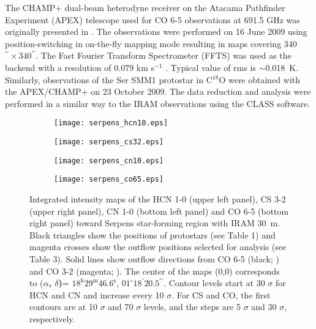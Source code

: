 \documentclass{aa}
\begin{document}
The CHAMP+ dual-beam heterodyne receiver on the Atacama Pathfinder Experiment (APEX) telescope used for CO 6-5 observations at 691.5 GHz was originally presented in \cite{Yil15}. The observations were performed on 16 June 2009 using position-switching in on-the-fly mapping mode resulting in maps covering 340$^{\prime\prime}\times 340^{\prime\prime}$. The Fast Fourier Transform Spectrometer (FFTS) was used as the backend with a resolution of 0.079 km s$^{-1}$ \citep{Kle06}. Typical value of rms is $\sim$0.018~K. 
Similarly, observations of the Ser SMM1 protostar in C$^{18}$O were obtained with the APEX/CHAMP+ on 23 October 2009. The data reduction and analysis were performed in a similar way to the IRAM observations using the CLASS software.

\begin{figure*}
\centering 
\begin{subfigure}{.45\textwidth} \label{1map} 
\centering
\texttt{[image: serpens\_hcn10.eps]} 
\caption{} 
\end{subfigure}
\begin{subfigure}{.45\textwidth} 
\label{2map} 
\centering
\texttt{[image: serpens\_cs32.eps]} 
\caption{} 
\end{subfigure}
\begin{subfigure}{.45\textwidth} 
\label{3map} 
\centering
\texttt{[image: serpens\_cn10.eps]} 
\caption{} \end{subfigure}
\begin{subfigure}{.45\textwidth} 
\label{4map} 
\centering
\texttt{[image: serpens\_co65.eps]} 
\caption{} \end{subfigure}
\caption{\label{iram_maps} Integrated intensity maps of the HCN 1-0 (upper left panel), CS
3-2 (upper right panel), CN 1-0 (bottom left panel) and CO 6-5 (bottom right panel) toward
Serpens star-forming region with IRAM 30~m. Black triangles show the positions of protostars
(see Table 1) and magenta crosses show the outflow positions selected for analysis (see Table 3). 
Solid lines show outflow directions from CO 6-5 (black; \citealt{Yil15}) and
CO 3-2 (magenta; \citealt{Dio10}). The center of the maps (0,0) corresponds 
to (\textbf{$\alpha$, $\delta$)}= $18^{\mathrm{h}} 29^{\mathrm{m}} 46.6^{\mathrm{s}}$, $01^{\circ}
18^{\prime} 20.5 ^{\prime\prime}$. Contour levels start at 30 $\sigma$
for HCN and CN and increase every 10 $\sigma$. For CS and CO, the first contours 
are at 10 $\sigma$ and 70 $\sigma$ levels, and the steps are 5 $\sigma$ and 
30 $\sigma$, respectively.} 
\end{figure*}
\end{document}
